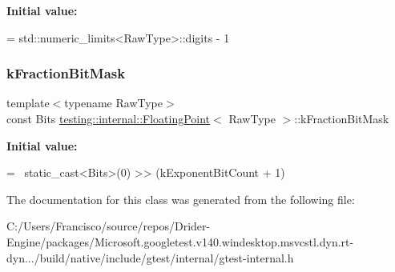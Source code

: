 {\bfseries Initial value\+:}
\begin{DoxyCode}
=
    std::numeric\_limits<RawType>::digits - 1
\end{DoxyCode}
\mbox{\label{classtesting_1_1internal_1_1_floating_point_a0ac75d4ffd24f14bca452abe8a718da1}} 
\subsubsection{\texorpdfstring{k\+Fraction\+Bit\+Mask}{kFractionBitMask}}
{\footnotesize\ttfamily template$<$typename Raw\+Type$>$ \\
const Bits \hyperlink{classtesting_1_1internal_1_1_floating_point}{testing\+::internal\+::\+Floating\+Point}$<$ Raw\+Type $>$\+::k\+Fraction\+Bit\+Mask\hspace{0.3cm}{\ttfamily [static]}}

{\bfseries Initial value\+:}
\begin{DoxyCode}
=
    ~static\_cast<Bits>(0) >> (kExponentBitCount + 1)
\end{DoxyCode}


The documentation for this class was generated from the following file\+:\begin{DoxyCompactItemize}
\item 
C\+:/\+Users/\+Francisco/source/repos/\+Drider-\/\+Engine/packages/\+Microsoft.\+googletest.\+v140.\+windesktop.\+msvcstl.\+dyn.\+rt-\/dyn.../build/native/include/gtest/internal/gtest-\/internal.\+h\end{DoxyCompactItemize}
